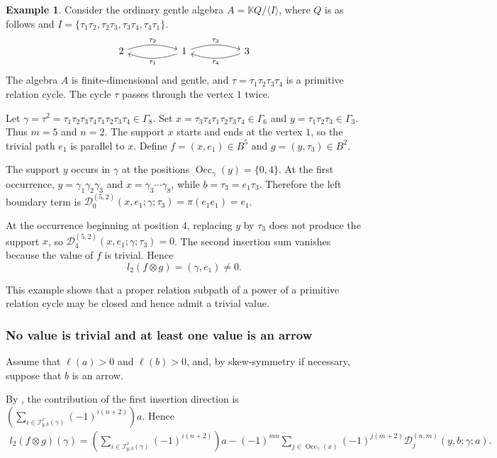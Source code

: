 \documentclass[11pt,a4paper,reqno]{amsart}
\newcommand{\mK}{\mathbb K}
\newcommand{\mD}{\mathcal D}
\newcommand{\mI}{\mathcal I}
\newcommand{\Occ}{\operatorname{Occ}}
\newcommand{\para}[2]{(#1,#2)}
\theoremstyle{plain}
\theoremstyle{definition}
\newtheorem{example}[example]{Example}
\numberwithin{equation}{section}
\begin{document}
	\begin{example}
		\label{ex:cycle-power-trivial-value}
		Consider the ordinary gentle algebra
		$A=\mK Q/\langle I\rangle$,
		where $Q$ is as follows and
		$I= \{ \tau_1\tau_2,\tau_2\tau_3, \tau_3\tau_4, \tau_4\tau_1 \}$.
		\[
		\begin{tikzcd}[column sep=5em]
			2
			\arrow[r,bend left=18,"\tau_2"]
			&
			1
			\arrow[l,bend left=18,"\tau_1"]
			\arrow[r,bend left=18,"\tau_3"]
			&
			3
			\arrow[l,bend left=18,"\tau_4"]
		\end{tikzcd}
		\]
		The algebra $A$ is finite-dimensional and gentle, and
		$\tau=\tau_1\tau_2\tau_3\tau_4$
		is a primitive relation cycle.  The cycle $\tau$ passes through the
		vertex $1$ twice.
		
		Let
		$\gamma=\tau^2 = \tau_1\tau_2\tau_3\tau_4 \tau_1\tau_2\tau_3\tau_4 \in\Gamma_8$.
		Set
		$x=\tau_3\tau_4\tau_1\tau_2\tau_3\tau_4\in\Gamma_6$ and
		$y=\tau_1\tau_2\tau_3\in\Gamma_3$.
		Thus $m=5$ and $n=2$.
		The support $x$ starts and ends at the vertex $1$, so the trivial path
		$e_1$ is parallel to $x$.  Define
		$f=\para{x}{e_1}\in B^5$ and $g=\para{y}{\tau_3}\in B^2$.
		
		The support $y$ occurs in $\gamma$ at the positions
		$\Occ_\gamma(y)=\{0,4\}$.
		At the first occurrence, $y=\gamma_1\gamma_2\gamma_3$ and
		$x=\gamma_3\cdots\gamma_8$, while $b=\tau_3=e_1\tau_3$.
		Therefore the left boundary term is
		$\mD_0^{(5,2)}(x,e_1;\gamma;\tau_3)=\pi(e_1e_1)=e_1$.
		
		At the occurrence beginning at position $4$, replacing $y$ by
		$\tau_3$ does not produce the support $x$, so
		$\mD_4^{(5,2)}(x,e_1;\gamma;\tau_3)=0$.
		The second insertion sum vanishes because the value of $f$ is trivial.
		Hence
		\[
		l_2(f\otimes g)
		=
		\para{\gamma}{e_1}
		\neq0.
		\]
		
		This example shows that a proper relation subpath of a power of a primitive relation cycle may be closed and hence admit a trivial value.
	\end{example}
	\subsubsection{No value is trivial and at least one value is an arrow}
	
	Assume that $\ell(a)>0$ and $\ell(b)>0$, and, by skew-symmetry if
	necessary, suppose that $b$ is an arrow.
	
	By , the contribution of the first
	insertion direction is
	$(\sum_{i\in\mI_{y,b}^{x}(\gamma)}(-1)^{i(n+2)})a$.
	Hence
	\begin{align}
		l_2(f\otimes g)(\gamma)
		=
		\left(
		\sum_{i\in\mI_{y,b}^{x}(\gamma)}
		(-1)^{i(n+2)}
		\right)a
		-
		(-1)^{mn}
		\sum_{j\in\Occ_\gamma(x)}
		(-1)^{j(m+2)}
		\mD_j^{(n,m)}(y,b;\gamma;a).
		\label{eq:cycle-power-arrow-read-off}
	\end{align}
	
\end{document}
